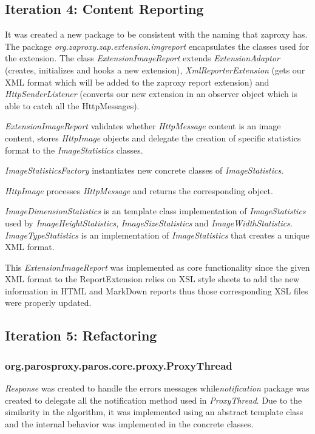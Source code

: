 \subsection{Iteration 4: Content Reporting}
It was created a new package to be consistent with the naming that zaproxy has. The package \textit{org.zaproxy.zap.extension.imgreport} encapsulates the classes used for the extension. The class \textit{ExtensionImageReport} extends \textit{ExtensionAdaptor} (creates, initializes and hooks a new extension), \textit{XmlReporterExtension} (gets our XML format which will be added to the zaproxy report extension) and \textit{HttpSenderListener} (converts our new extension in an observer object which is able to catch all the HttpMessages).
\par
\textit{ExtensionImageReport} validates whether \textit{HttpMessage} content is an image content, stores \textit{HttpImage} objects and delegate the creation of specific statistics format to the \textit{ImageStatistics} classes. 
\par
\textit{ImageStatisticsFactory} instantiates new concrete classes of \textit{ImageStatistics}.
\par
\textit{HttpImage} processes \textit{HttpMessage} and returns the corresponding object.
\par
\textit{ImageDimensionStatistics} is an template class implementation of \textit{ImageStatistics} used by \textit{ImageHeightStatistics}, \textit{ImageSizeStatistics} and \textit{ImageWidthStatistics}. \textit{ImageTypeStatistics} is an implementation of \textit{ImageStatistics} that creates a unique XML format.
\par
This \textit{ExtensionImageReport} was implemented as core functionality since the given XML format to the ReportExtension relies on XSL style sheets to add the new information in HTML and MarkDown reports thus those corresponding XSL files were properly updated.

\subsection{Iteration 5: Refactoring}
\subsubsection{org.parosproxy.paros.core.proxy.ProxyThread}

\textit{Response} was created to handle the errors messages while\textit{notification} package was created to delegate all the notification method used in \textit{ProxyThread}. Due to the similarity in the algorithm, it was implemented using an abstract template class and the internal behavior was implemented in the concrete classes.
